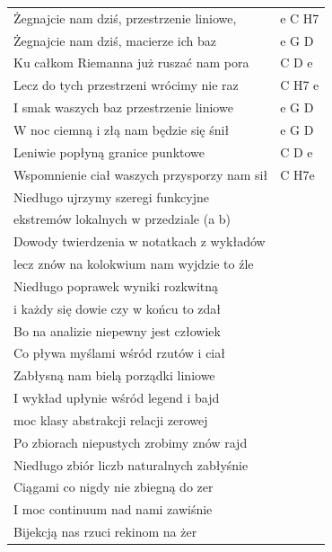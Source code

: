 \documentclass[11pt]{mwrep}
\renewcommand{\[}{\begin{equation}}
\renewcommand{\]}{\end{equation}}
\begin{document}
{\begin{tabular}{ll}
{Żegnajcie nam dziś, przestrzenie} liniowe,	  &  e C H7 \\ 
Żegnajcie nam dziś, macierze ich baz				  &  e G D \\ 
Ku całkom Riemanna już ruszać nam pora				  &  C D e \\ 
Lecz do tych przestrzeni wrócimy nie raz			  &  C H7 e \vspace{0.8eM}\\ 

		{I smak waszych baz przestrzenie} liniowe		  &  e G D \\ 
		W noc ciemną i złą nam będzie się śnił		  &  e G D \\ 
		Leniwie popłyną granice punktowe			  &  C D e \\ 
		Wspomnienie ciał waszych przysporzy nam sił	  &  C H7e \vspace{0.8eM}\\ 

Niedługo ujrzymy szeregi funkcyjne \\ 
ekstremów lokalnych w przedziale (a b) \\ 
Dowody twierdzenia w notatkach z wykładów \\ 
lecz znów na kolokwium nam wyjdzie to źle \vspace{0.8eM}\\ 

Niedługo poprawek wyniki rozkwitną \\ 
i każdy się dowie czy w końcu to zdał \\ 
Bo na analizie niepewny jest człowiek \\ 
Co pływa myślami wśród rzutów i ciał \vspace{0.8eM}\\ 

Zabłysną nam bielą porządki liniowe \\ 
I wykład upłynie wśród legend i bajd \\ 
moc klasy abstrakcji relacji zerowej \\ 
Po zbiorach niepustych zrobimy znów rajd \vspace{0.8eM}\\ 

Niedługo zbiór liczb naturalnych zabłyśnie \\ 
Ciągami co nigdy nie zbiegną do zer \\ 
I moc continuum nad nami zawiśnie \\ 
Bijekcją nas rzuci rekinom na żer \vspace{0.8eM}\\ 


\end{tabular}}
\end{document}
